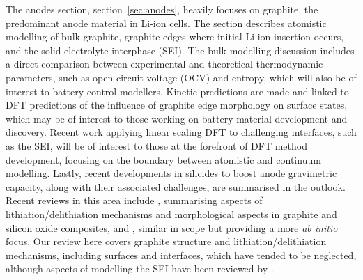 \documentclass[../main.tex]{subfiles}
\begin{document}
The anodes section, section~\ref{sec:anodes}, heavily focuses on graphite, the predominant anode material in Li-ion cells. The section describes atomistic modelling of bulk graphite, graphite edges where initial Li-ion insertion occurs, and the solid-electrolyte interphase (SEI). The bulk modelling discussion includes a direct comparison between experimental and theoretical thermodynamic parameters, such as open circuit voltage (OCV) and entropy, which will also be of interest to battery control modellers. Kinetic predictions are made and linked to DFT predictions of the influence of graphite edge morphology on surface states, which may be of interest to those working on battery material development and discovery. Recent work applying linear scaling DFT to challenging interfaces, such as the SEI, will be of interest to those at the forefront of DFT method development, focusing on the boundary between atomistic and continuum modelling. Lastly, recent developments in silicides to boost anode gravimetric capacity, along with their associated challenges, are summarised in the outlook. Recent reviews in this area include \citeauthor{asenbauer_success_2020} \cite{asenbauer_success_2020}, summarising aspects of lithiation/delithiation mechanisms and morphological aspects in graphite and silicon oxide composites, and \citeauthor{ZHANG2021147} \cite{ZHANG2021147}, similar in scope but providing a more \textit{ab initio} focus. Our review here covers graphite structure and lithiation/delithiation mechanisms, including surfaces and interfaces, which have tended to be neglected, although aspects of modelling the SEI have been reviewed by \citeauthor{Wang2018} \cite{Wang2018}.
\end{document}
